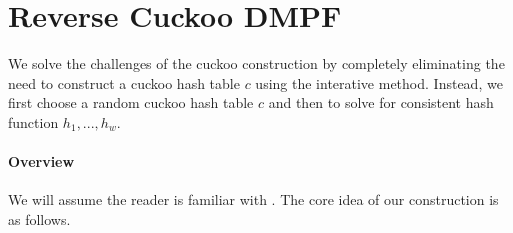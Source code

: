 
\section{Reverse Cuckoo DMPF}\label{sec:revCuckoo}

We solve the challenges of the cuckoo construction by completely eliminating the need to construct a cuckoo hash table $c$ using the interative method. Instead, we first choose a random cuckoo hash table $c$ and then to solve for consistent hash function $h_1,...,h_w$.

\paragraph{Overview} We will assume the reader is familiar with . The core idea of our construction is as follows.


